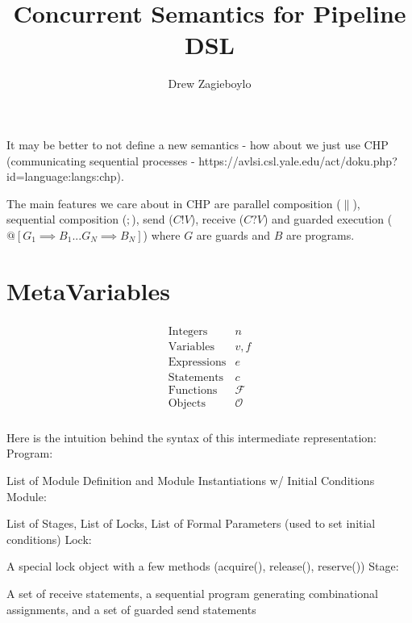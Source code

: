 \documentclass{article}
\begin{document}
\title{Concurrent Semantics for Pipeline DSL}
\author{Drew Zagieboylo}
\maketitle

It may be better to not define a new semantics - how about
we just use CHP (communicating sequential processes - https://avlsi.csl.yale.edu/act/doku.php?id=language:langs:chp).

The main features we care about in CHP are parallel composition ($\parallel$), sequential composition ($;$),
send ($C!V$), receive ($C?V$) and guarded execution ($@[G_1 \implies B_1 ... G_N \implies B_N]$)
where $G$ are guards and $B$ are programs.

\section{MetaVariables}
\begin{align*}
  \begin{array}{lc}
    \mbox{Integers} & n \\
    \mbox{Variables} & v,f\\
    \mbox{Expressions} & e\\
    \mbox{Statements} & c\\
    \mbox{Functions} & \mathcal{F}\\
    \mbox{Objects} & \mathcal{O}\\
  \end{array}
\end{align*}

Here is the intuition behind the syntax of this intermediate representation:\newline
Program:

List of Module Definition and Module Instantiations w/ Initial Conditions\newline
Module:

List of Stages, List of Locks, List of Formal Parameters (used to set initial conditions)\newline
Lock:

A special lock object with a few methods (acquire(), release(), reserve())\newline
Stage:

A set of receive statements, a sequential program generating combinational assignments,
and a set of guarded send statements\newline
\end{document}
